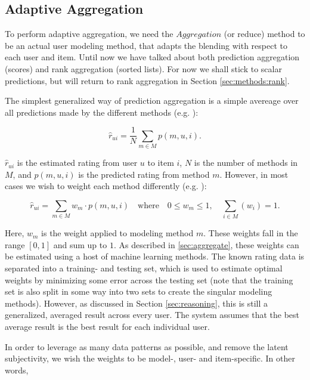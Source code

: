 \subsection{Adaptive Aggregation}

To perform adaptive aggregation, we need the $Aggregation$ (or $\mathrm{reduce}$) method to be an actual user modeling method,
that adapts the blending with respect to each user and item.
Until now we have talked about both prediction aggregation (scores) and rank aggregation (sorted lists).
For now we shall stick to scalar predictions, but will return to rank aggregation in Section \ref{sec:methods:rank}.

The simplest generalized way of prediction aggregation is a simple avereage over all predictions made
by the different methods (e.g. \citet[p3]{Aslam2001}):

\begin{equation*}
  \hat{r}_{ui} = \frac{1}{N} \sum_{m \in M} p(m,u,i).
\end{equation*}

$\hat{r}_{ui}$ is the estimated rating from user $u$ to item $i$,
$N$ is the number of methods in $M$, and $p(m,u,i)$ is the predicted rating from method $m$.
However, in most cases we wish to weight each method differently (e.g. \cite{Claypool1999} ):

\begin{equation*}
  \hat{r}_{ui} = \sum_{m \in M} w_{m} \cdot p(m,u,i) 
  \quad \text{where} \quad 0 \leq w_{m} \leq 1, \quad \sum_{i \in M} (w_i) = 1.
\end{equation*}

Here, $w_m$ is the weight applied to modeling method $m$. These weights fall in the range $[0,1]$ and sum up to $1$.
As described in \ref{sec:aggregate}, these weights can be estimated using a host of machine learning methods.
The known rating data is separated into a training- and testing set, which is used to estimate optimal weights
by minimizing some error across the testing set 
(note that the training set is also split in some way into two sets to create the singular modeling methods).
However, as discussed in Section \ref{sec:reasoning},
this is still a generalized, averaged result across every user. 
The system assumes that the best average result is the best result for each individual user.

In order to leverage as many data patterns as possible, and remove the latent subjectivity,
we wish the weights to be model-, user- and item-specific. In other words,


